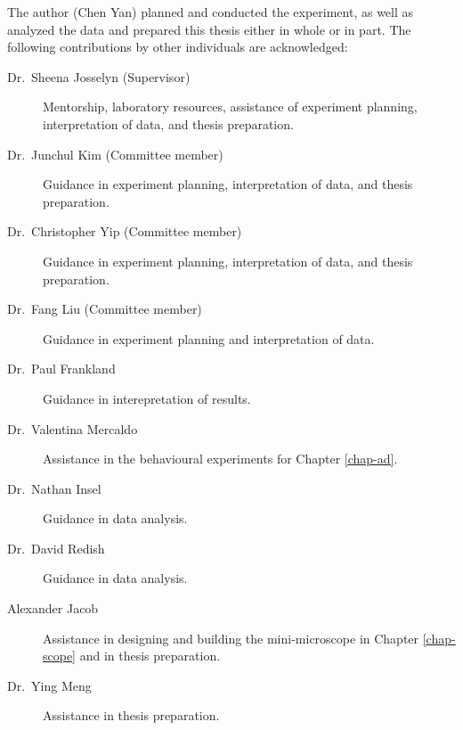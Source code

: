 The author (Chen Yan) planned and conducted the experiment, as well as analyzed the data and prepared this thesis either in whole or in part. The following contributions by other individuals are acknowledged:
\begin{description}

\item[Dr.~Sheena Josselyn (Supervisor)] Mentorship, laboratory resources, assistance of experiment planning, interpretation of data, and thesis preparation.

\item[Dr.~Junchul Kim (Committee member)] Guidance in experiment planning, interpretation of data, and thesis preparation.

\item[Dr.~Christopher Yip (Committee member)] Guidance in experiment planning, interpretation of data, and thesis preparation.
\item[Dr.~Fang Liu (Committee member)] Guidance in experiment planning and interpretation of data.

\item[Dr.~Paul Frankland] Guidance in interepretation of results.

\item[Dr.~Valentina Mercaldo] Assistance in the behavioural experiments for Chapter \ref{chap-ad}.

\item[Dr.~Nathan Insel] Guidance in data analysis.

\item[Dr.~David Redish] Guidance in data analysis. 

\item[Alexander Jacob] Assistance in designing and building the mini-microscope in Chapter \ref{chap-scope} and in thesis preparation.
\item[Dr.~Ying Meng] Assistance in thesis preparation.


\end{description}
